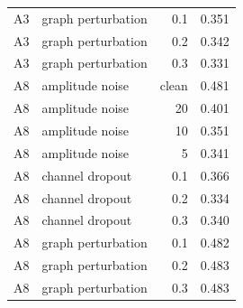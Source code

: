 \begin{table}[t]
\begin{tabular}{llrr}
A3 & graph perturbation & 0.1 & 0.351 \\
A3 & graph perturbation & 0.2 & 0.342 \\
A3 & graph perturbation & 0.3 & 0.331 \\
A8 & amplitude noise & clean & 0.481 \\
A8 & amplitude noise & 20 & 0.401 \\
A8 & amplitude noise & 10 & 0.351 \\
A8 & amplitude noise & 5 & 0.341 \\
A8 & channel dropout & 0.1 & 0.366 \\
A8 & channel dropout & 0.2 & 0.334 \\
A8 & channel dropout & 0.3 & 0.340 \\
A8 & graph perturbation & 0.1 & 0.482 \\
A8 & graph perturbation & 0.2 & 0.483 \\
A8 & graph perturbation & 0.3 & 0.483 \\
\bottomrule
\end{tabular}
\end{table}
